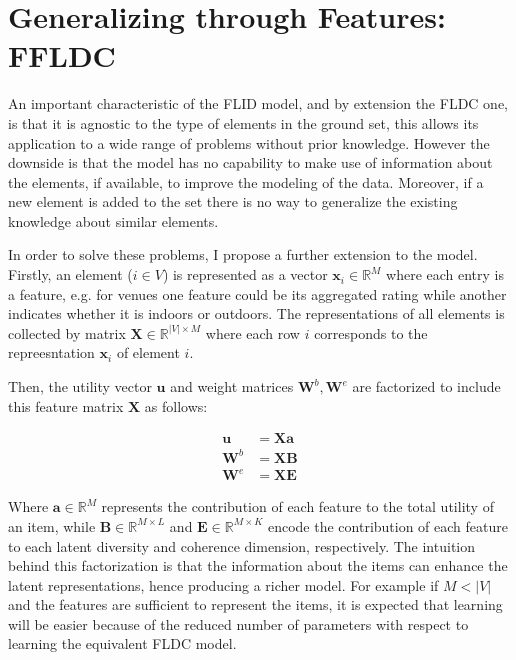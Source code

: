\section{Generalizing through Features: FFLDC}

An important characteristic of the FLID model, and by extension the FLDC one, is that it is agnostic to the type of elements in the ground set, this allows its application to a wide range of problems without prior knowledge. However the downside is that the model has no capability to make use of information about the elements, if available, to improve the modeling of the data. Moreover, if a new element is added to the set there is no way to generalize the existing knowledge about similar elements.

In order to solve these problems, I propose a further extension to the model. Firstly, an element ($i \in V$) is represented as a vector $\mathbf{x}_{i} \in \mathbb{R}^{M}$ where each entry is a feature, e.g. for venues one feature could be its aggregated rating while another indicates whether it is indoors or outdoors. The representations of all elements is collected by matrix $\mathbf{X} \in \mathbb{R}^{|V| \times M}$ where each row $i$ corresponds to the repreesntation $\mathbf{x}_{i}$ of element $i$.

Then, the utility vector $\mathbf{u}$ and weight matrices $\mathbf{W}^{b}, \mathbf{W}^{e}$ are factorized to include this feature matrix $\mathbf{X}$ as follows:

\begin{align}
  \mathbf{u} &= \mathbf{Xa}   \label{eq:ffldc-factorization-1} \\
  \mathbf{W}^{b} &= \mathbf{XB}  \label{eq:ffldc-factorization-2} \\
  \mathbf{W}^{e} &= \mathbf{XE}
  \label{eq:ffldc-factorization-3}
\end{align} 

Where $\mathbf{a} \in \mathbb{R}^{M}$ represents the contribution of each feature to the total utility of an item, while $\mathbf{B} \in \mathbb{R}^{M \times L}$ and $\mathbf{E} \in \mathbb{R}^{M \times K}$ encode the contribution of each feature to each latent diversity and coherence dimension, respectively. The intuition behind this factorization is that the information about the items can enhance the latent representations, hence producing a richer model. For example if $M < |V|$ and the features are sufficient to represent the items, it is expected that learning will be easier because of the reduced number of parameters with respect to learning the equivalent FLDC model.

